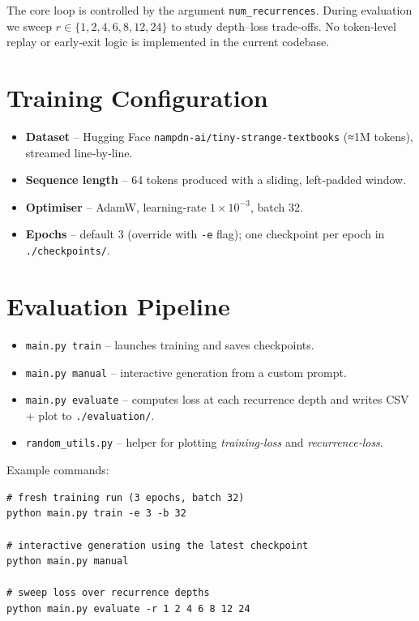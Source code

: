The core loop is controlled by the argument
\texttt{num\_recurrences}.  
During evaluation we sweep
$r\in\{1,2,4,6,8,12,24\}$ to study depth–loss trade‑offs.
No token‑level replay or early‑exit logic is implemented in the current
codebase.

\section{Training Configuration}

\begin{itemize}
    \item \textbf{Dataset} – Hugging Face
          \texttt{nampdn-ai/tiny-strange-textbooks} (≈1M tokens),
          streamed line‑by‑line.
    \item \textbf{Sequence length} – 64 tokens produced with a sliding,
          left‑padded window.
    \item \textbf{Optimiser} – AdamW, learning‑rate $1\times10^{-3}$,
          batch 32.
    \item \textbf{Epochs} – default 3 (override with \texttt{-e} flag);
          one checkpoint per epoch in \texttt{./checkpoints/}.
\end{itemize}

\section{Evaluation Pipeline}

\begin{itemize}
    \item \texttt{main.py train} – launches training and saves
          checkpoints.
    \item \texttt{main.py manual} – interactive generation from a custom
          prompt.
    \item \texttt{main.py evaluate} – computes loss at each recurrence
          depth and writes CSV + plot to \texttt{./evaluation/}.
    \item \texttt{random\_utils.py} – helper for plotting
          \textit{training‑loss} and \textit{recurrence‑loss}.
\end{itemize}

Example commands:

\begin{verbatim}
# fresh training run (3 epochs, batch 32)
python main.py train -e 3 -b 32

# interactive generation using the latest checkpoint
python main.py manual

# sweep loss over recurrence depths
python main.py evaluate -r 1 2 4 6 8 12 24
\end{verbatim}
